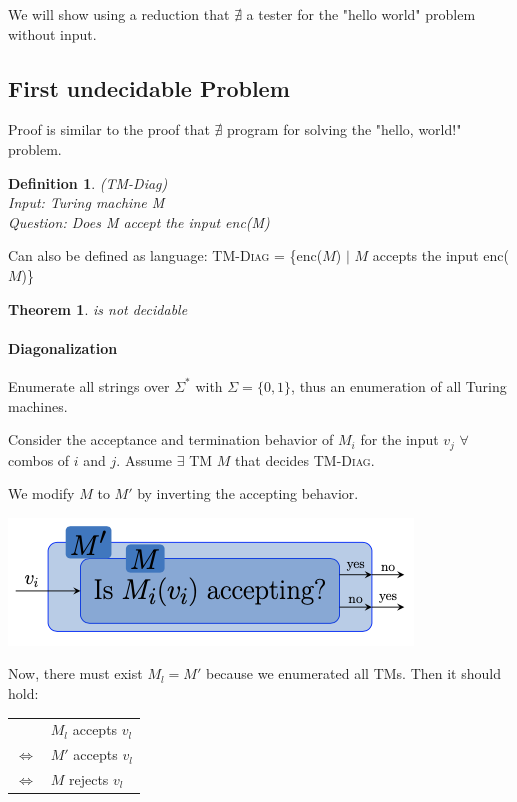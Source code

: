 \documentclass[a3paper, 8pt]{extarticle}
\newtheorem{theorem}{Theorem}[section]
\newtheorem*{definition}{Definition}
\begin{document}
\begin{multicols*}{6}
 We will show using a reduction that $\nexists$ a tester for the "hello world" problem without input. 
 
\subsection{First undecidable Problem}

Proof is similar to the proof that $\nexists$ program for solving the "hello, world!" problem.

\begin{definition}
     (TM-Diag)\\
     Input: Turing machine M\\ Question: Does M accept the input enc(M)
\end{definition}
 Can also be defined as language: \textsc{TM-Diag} = \{enc($M$) $|$ $M$ accepts the input enc($M$)\}
\begin{theorem}
{} is not decidable
\end{theorem}

\paragraph{Diagonalization}
Enumerate all strings over $\Sigma^*$ with $\Sigma=\{0,1\}$, thus an enumeration of all Turing machines.

Consider the acceptance and termination behavior of $M_i$ for the input $v_j$ $\forall$ combos of $i$ and $j$.
Assume $\exists$ TM $M$ that decides \textsc{TM-Diag}.

We modify $M$ to $M'$ by inverting the accepting behavior.

\begin{center}
\includegraphics[width=0.5\columnwidth]{images/Screen Shot 2022-12-29 at 14.39.55.png}
\end{center}

Now, there must exist $M_l=M'$ because we enumerated all TMs. Then it should hold:

\begin{tabular}{l l}
     & $M_l$ accepts $v_l$\\ 
     $\iff$ & $M'$ accepts $v_l$ \\
     $\iff$ & $M$ rejects $v_l$ 
\end{tabular}


\end{multicols*}
\end{document}

